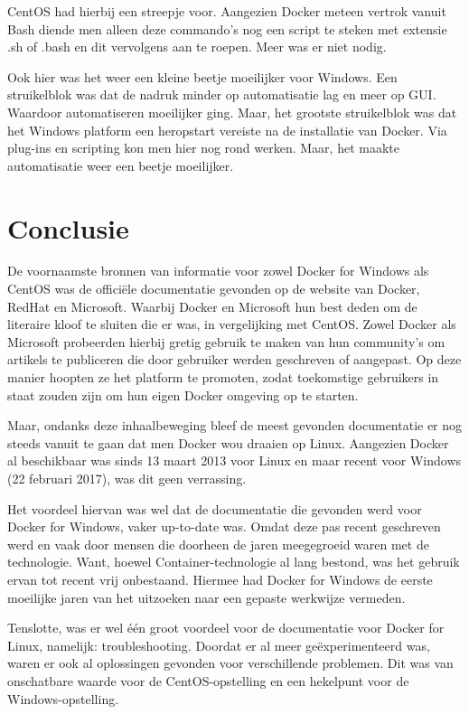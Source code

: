 CentOS had hierbij een streepje voor. Aangezien Docker meteen vertrok vanuit Bash diende men alleen deze commando's nog een script te steken met extensie .sh of .bash en dit vervolgens aan te roepen. Meer was er niet nodig.

Ook hier was het weer een kleine beetje moeilijker voor Windows. Een struikelblok was dat de nadruk minder op automatisatie lag en meer op GUI. Waardoor automatiseren moeilijker ging. Maar, het grootste struikelblok was dat het Windows platform een heropstart vereiste na de installatie van Docker. Via plug-ins en scripting kon men hier nog rond werken. Maar, het maakte automatisatie weer een beetje moeilijker.

\section{Conclusie}
De voornaamste bronnen van informatie voor zowel Docker for Windows als CentOS was de officiële documentatie gevonden op de website van Docker, RedHat en Microsoft. Waarbij Docker en Microsoft hun best deden om de literaire kloof te sluiten die er was, in vergelijking met CentOS. Zowel Docker als Microsoft probeerden hierbij gretig gebruik te maken van hun community’s om artikels te publiceren die door gebruiker werden geschreven of aangepast. Op deze manier hoopten ze het platform te promoten, zodat toekomstige gebruikers in staat zouden zijn om hun eigen Docker omgeving op te starten.

Maar, ondanks deze inhaalbeweging bleef de meest gevonden documentatie er nog steeds vanuit te gaan dat men Docker wou draaien op Linux. Aangezien Docker al beschikbaar was sinds 13 maart 2013 voor Linux en maar recent voor Windows (22 februari 2017), was dit geen verrassing.

Het voordeel hiervan was wel dat de documentatie die gevonden werd voor Docker for Windows, vaker up-to-date was. Omdat deze pas recent geschreven werd en vaak door mensen die doorheen de jaren meegegroeid waren met de technologie. Want, hoewel Container-technologie al lang bestond, was het gebruik ervan tot recent vrij onbestaand. Hiermee had Docker for Windows de eerste moeilijke jaren van het uitzoeken naar een gepaste werkwijze vermeden. 

Tenslotte, was er wel één groot voordeel voor de documentatie voor Docker for Linux, namelijk: troubleshooting. Doordat er al meer geëxperimenteerd was, waren er ook al oplossingen gevonden voor verschillende problemen. Dit was van onschatbare waarde voor de CentOS-opstelling en een hekelpunt voor de Windows-opstelling.